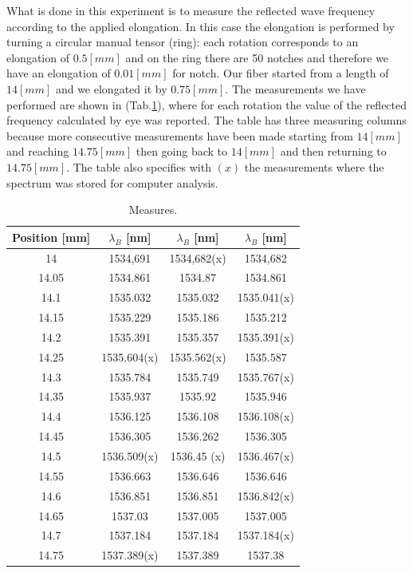 What is done in this experiment is to measure the reflected wave frequency according to the applied elongation. In this case the elongation is performed by turning a circular manual tensor (ring): each rotation corresponds to an elongation of $0.5 [mm]$ and on the ring there are 50 notches and therefore we have an elongation of $0.01 [mm]$ for notch. Our fiber started from a length of $14 [mm]$ and we elongated it by $0.75 [mm]$. The measurements we have performed are shown in (Tab.\ref{table:measures}), where for each rotation the value of the reflected frequency calculated by eye was reported. The table has three measuring columns because more consecutive measurements have been made starting from $14 [mm]$ and reaching $14.75 [mm]$ then going back to $14 [mm]$ and then returning to $14.75 [mm]$. The table also specifies with $(x)$ the measurements where the spectrum was stored for computer analysis.
\begin{table}[h]
  \centering
  \begin{tabular}{c|c|c|c}
      Position [mm]  &  $\lambda_B$  [nm]  &  $\lambda_B$  [nm]  &  $\lambda_B$  [nm]  \\
      \hline
      14     &  1534,691     &  1534,682(x)  &  1534,682     \\
      14.05  &  1534.861     &  1534.87      &  1534.861     \\
      14.1   &  1535.032     &  1535.032     &  1535.041(x)  \\
      14.15  &  1535.229     &  1535.186     &  1535.212     \\
      14.2   &  1535.391     &  1535.357     &  1535.391(x)  \\
      14.25  &  1535.604(x)  &  1535.562(x)  &  1535.587     \\
      14.3   &  1535.784     &  1535.749     &  1535.767(x)  \\
      14.35  &  1535.937     &  1535.92      &  1535.946     \\
      14.4   &  1536.125     &  1536.108     &  1536.108(x)  \\
      14.45  &  1536.305     &  1536.262     &  1536.305     \\
      14.5   &  1536.509(x)  &  1536.45 (x)  &  1536.467(x)  \\
      14.55  &  1536.663     &  1536.646     &  1536.646     \\
      14.6   &  1536.851     &  1536.851     &  1536.842(x)  \\
      14.65  &  1537.03      &  1537.005     &  1537.005     \\
      14.7   &  1537.184     &  1537.184     &  1537.184(x)  \\
      14.75  &  1537.389(x)  &  1537.389     &  1537.38      \\

  \end{tabular}
  \caption{Measures.}
  \label{table:measures}
\end{table}

